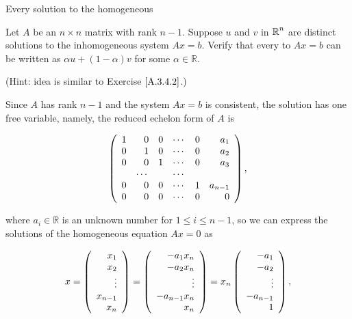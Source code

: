 \documentclass{ximera}
\begin{document}
\begin{exercise} \label{YZ_3.4.5}
Every solution to the homogeneous

Let $A$ be an $n\times n$ matrix with rank $n-1$.  Suppose $u$ and $v$ in $\mbox{$\mathbb{R}$}^n$ are distinct solutions to the inhomogeneous system $Ax = b$.  Verify that every  to $Ax = b$ can be written as 
$\alpha u+(1-\alpha)v$ for some $\alpha\in \mathbb R$.

(Hint: idea is similar to Exercise $\ref{A.3.4.2}$.)

\begin{solution}
\soln 



Since $A$ has rank $n-1$ and the system $Ax=b$ is consistent, the solution has one free variable, namely, the reduced echelon form of $A$ is 

\[
\left(\begin{array}{rrrrrrrrrrrrrrrrrr} 1 & 0 & 0 & \cdots &0 & a_1\\ 0 &1 &0   &\cdots &0&a_2\\ 0& 0 &1 &\cdots &0&a_3 \\ & \cdots & & \cdots& &\\ 0& 0 &0 &\cdots &1&a_{n-1}\\  0& 0 &0 &\cdots &0&0 \end{array}\right),
\]

where $a_i\in \mathbb R$ is an unknown number for $1\le i\le n-1$, so we can express the solutions of the homogeneous equation $Ax=0$ as 

\[
x=\left(\begin{array}{rrrrrrrrrrrrrrrrrr} x_1 \\ x_2 \\ \vdots \\ x_{n-1} \\x_n \end{array}\right)=\left(\begin{array}{rrrrrrrrrrrrrrrrrr} -a_1x_n \\ -a_2x_n \\ \vdots \\-a_{n-1}x_n\\ x_n \end{array}\right)
=x_n\left(\begin{array}{rrrrrrrrrrrrrrrrrr} -a_1 \\ -a_2 \\ \vdots \\-a_{n-1}\\ 1 \end{array}\right),
\]


\end{solution}
\end{exercise}
\end{document}
